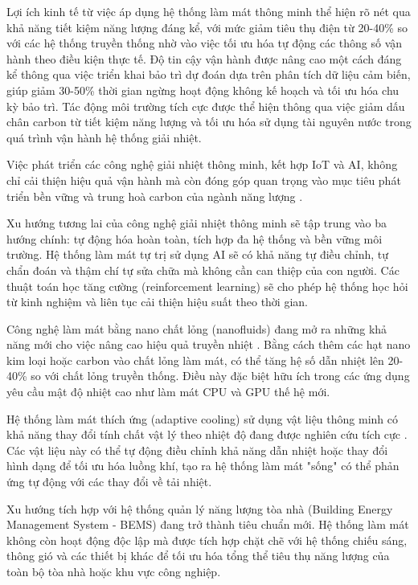 \documentclass[../main.tex]{subfiles}
\begin{document}
Lợi ích kinh tế từ việc áp dụng hệ thống làm mát thông minh thể hiện rõ nét qua khả năng tiết kiệm năng lượng đáng kể, với mức giảm tiêu thụ điện từ 20-40\% so với các hệ thống truyền thống nhờ vào việc tối ưu hóa tự động các thông số vận hành theo điều kiện thực tế. Độ tin cậy vận hành được nâng cao một cách đáng kể thông qua việc triển khai bảo trì dự đoán dựa trên phân tích dữ liệu cảm biến, giúp giảm 30-50\% thời gian ngừng hoạt động không kế hoạch và tối ưu hóa chu kỳ bảo trì. Tác động môi trường tích cực được thể hiện thông qua việc giảm dấu chân carbon từ tiết kiệm năng lượng và tối ưu hóa sử dụng tài nguyên nước trong quá trình vận hành hệ thống giải nhiệt.

Việc phát triển các công nghệ giải nhiệt thông minh, kết hợp IoT và AI, không chỉ cải thiện hiệu quả vận hành mà còn đóng góp quan trọng vào mục tiêu phát triển bền vững và trung hoà carbon của ngành năng lượng \cite{nguyen2022iot}.

Xu hướng tương lai của công nghệ giải nhiệt thông minh sẽ tập trung vào ba hướng chính: tự động hóa hoàn toàn, tích hợp đa hệ thống và bền vững môi trường. Hệ thống làm mát tự trị sử dụng AI sẽ có khả năng tự điều chỉnh, tự chẩn đoán và thậm chí tự sửa chữa mà không cần can thiệp của con người. Các thuật toán học tăng cường (reinforcement learning) sẽ cho phép hệ thống học hỏi từ kinh nghiệm và liên tục cải thiện hiệu suất theo thời gian.

Công nghệ làm mát bằng nano chất lỏng (nanofluids) đang mở ra những khả năng mới cho việc nâng cao hiệu quả truyền nhiệt \cite{chen2023nanofluids}. Bằng cách thêm các hạt nano kim loại hoặc carbon vào chất lỏng làm mát, có thể tăng hệ số dẫn nhiệt lên 20-40\% so với chất lỏng truyền thống. Điều này đặc biệt hữu ích trong các ứng dụng yêu cầu mật độ nhiệt cao như làm mát CPU và GPU thế hệ mới.

Hệ thống làm mát thích ứng (adaptive cooling) sử dụng vật liệu thông minh có khả năng thay đổi tính chất vật lý theo nhiệt độ đang được nghiên cứu tích cực \cite{pham2023adaptive}. Các vật liệu này có thể tự động điều chỉnh khả năng dẫn nhiệt hoặc thay đổi hình dạng để tối ưu hóa luồng khí, tạo ra hệ thống làm mát "sống" có thể phản ứng tự động với các thay đổi về tải nhiệt.

Xu hướng tích hợp với hệ thống quản lý năng lượng tòa nhà (Building Energy Management System - BEMS) đang trở thành tiêu chuẩn mới. Hệ thống làm mát không còn hoạt động độc lập mà được tích hợp chặt chẽ với hệ thống chiếu sáng, thông gió và các thiết bị khác để tối ưu hóa tổng thể tiêu thụ năng lượng của toàn bộ tòa nhà hoặc khu vực công nghiệp.
\end{document}
